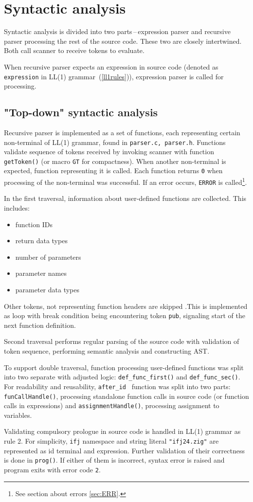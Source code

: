 \documentclass[a4paper, 11pt]{article}
\begin{document}
\section{Syntactic analysis}\label{sec:SYNTACTIC}
Syntactic analysis is divided into two parts\,--\,expression parser and
recursive parser processing the rest of the source code. These two are closely intertwined.
Both call scanner to receive tokens to evaluate.\par
When recursive parser expects an expression in source code (denoted as \verb|expression| in LL(1) grammar~(\ref{ll1rules})), 
expression parser is called for processing.
\subsection{"Top-down" syntactic analysis}\label{sec:PARSER}
Recursive parser is implemented as a set of functions, each representing certain non-terminal of LL(1) grammar, found in
\verb|parser.c, parser.h|.
Functions validate sequence of tokens received by invoking scanner with function \verb|getToken()| (or macro \verb|GT| for 
compactness). When another non-terminal is expected, function representing it is called.
Each function returns \verb|0| when processing of the non-terminal was successful. If an error occurs, \verb|ERROR| is called\footnote{See section
about errors \ref{sec:ERR}.}.
\par
In the first traversal, information about user-defined functions are collected. This includes:
\begin{itemize}
\item function IDs
\item return data types
\item number of parameters
\item parameter names 
\item parameter data types
\end{itemize}
Other tokens, not representing function headers are skipped 
.This is implemented as loop with break condition being encountering token \verb|pub|, signaling start of the next function definition.
\par
Second traversal performs regular parsing of the source code with validation of token sequence, performing semantic analysis and constructing
AST.
\par
To support double traversal, function processing user-defined functions was split into two separate with 
adjusted logic: \verb|def_func_first()| and \verb|def_func_sec()|. For readability and reusability, \verb|after_id|~
function was split into two parts: \verb|funCallHandle()|, processing standalone function calls in source code (or function calls 
in expressions) and \verb|assignmentHandle()|, processing assignment to variables.
\par
Validating compulsory prologue in source code is handled in LL(1) grammar as rule 2. For simplicity, 
\verb|ifj| namespace and string literal \verb|"ifj24.zig"| are represented as id terminal and expression.
Further validation of their correctness is done in \verb|prog()|. If either of them is incorrect, syntax error
is raised and program exits with error code \verb|2|.
\end{document}
